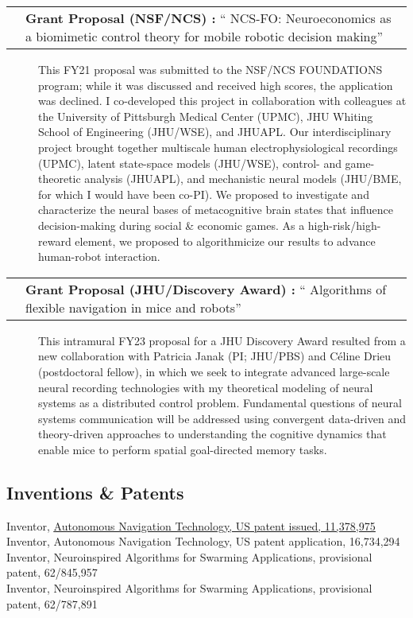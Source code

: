\documentclass[10pt]{article}
\makeatletter
\newcommand{\itemtitle}[1]{{\color{hopkinsblue}\ul{#1}}}
\newcommand{\unpubtitle}[1]{{\color{hopkinsblue} #1}}
\newcommand{\researchnote}[1]{
  \begin{description}
    \item[] {\hspace{2.2ex}\color{darkgray} #1}
  \end{description}
}
\newcommand{\researchactivity}[4]{
  \begin{minipage}[t]{\textwidth}
    \begin{tabular}{@{\hspace{2ex}}l>{\raggedright\arraybackslash}p{.8\textwidth}}
      \makebox[1.2in][l]{#1} & \textbf{#2:}
      ``\unpubtitle{#3}'' 
    \end{tabular}
  \researchnote{\hspace{1ex} #4}
  \end{minipage}
  \medbreak
}
\newcommand{\lefttabline}[3]{\hspace{2ex}\makebox[#1][l]{#2} #3\\}
\makeatother
\begin{document}
\researchactivity
{Feb. 26, 2020}
{Grant Proposal (NSF/NCS) }
{NCS-FO: Neuroeconomics as a biomimetic control theory for mobile robotic
decision making}
{This FY21 proposal was submitted to the NSF/NCS FOUNDATIONS program; while
  it was discussed and received high scores, the application was declined. I
  co-developed this project in collaboration with colleagues at the University of
  Pittsburgh Medical Center (UPMC), JHU Whiting School of Engineering (JHU/WSE),
  and JHUAPL. Our interdisciplinary project brought together multiscale human
  electrophysiological recordings (UPMC), latent state-space models (JHU/WSE),
  control- and game-theoretic analysis (JHUAPL), and mechanistic neural models
  (JHU/BME, for which I would have been co-PI). We proposed to investigate and
  characterize the neural bases of metacognitive brain states that influence
  decision-making during social \& economic games. As a high-risk/high-reward
  element, we proposed to algorithmicize our results to advance human-robot
interaction.}

\researchactivity
{Jan. 14, 2022}
{Grant Proposal (JHU/Discovery Award) }
{Algorithms of flexible navigation in mice and robots}
{This intramural FY23 proposal for a JHU Discovery Award resulted from a new
  collaboration with Patricia Janak (PI; JHU/PBS) and Céline Drieu (postdoctoral
  fellow), in which we seek to integrate advanced large-scale neural recording
  technologies with my theoretical modeling of neural systems as a distributed
  control problem. Fundamental questions of neural systems communication will
  be addressed using convergent data-driven and theory-driven approaches
  to understanding the cognitive dynamics that enable mice to perform spatial
goal-directed memory tasks.}

\medskip

\subsection*{Inventions \& Patents}
\label{sec:patents}

\lefttabline{0.8in}{7/5/2022}{Inventor, 
  \href{https://www.freepatentsonline.com/11378975.html}{\itemtitle{Autonomous
Navigation Technology, US patent issued, 11,378,975}}}
\lefttabline{0.8in}{1/3/2020}{Inventor, Autonomous Navigation Technology, US
patent application, 16,734,294}
\lefttabline{0.8in}{5/10/2019}{Inventor, Neuroinspired Algorithms for Swarming
Applications, provisional patent, 62/845,957}
\lefttabline{0.8in}{1/3/2019}{Inventor, Neuroinspired Algorithms for Swarming
Applications, provisional patent, 62/787,891}
\end{document}
